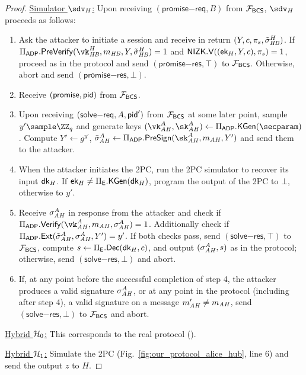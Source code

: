 \begin{proof}
\smallskip
\noindent\underline{Simulator $\Sim_H$:} Upon receiving $(\mathsf{promise}\mathsf{-req}, B)$ from $\mathcal{F}_{\mathsf{BCS}}$, $\Sim_H$ proceeds as follows:
\begin{enumerate}
    \item Ask the attacker to initiate a session and receive in return $(Y, c, \pi_s, \tilde{\sigma}_{\mathit{HB}}^H)$. If $\Pi_\ADP.\prevrfy(\vk_\hb^H, m_\hb, Y, \presig_\hb^H) = 1$ and $\mathsf{NIZK}.\mathsf{V}((\mathsf{ek}_H, Y,c), \pi_s) = 1$, proceed as in the protocol and send $(\mathsf{promise}\mathsf{-res}, \top)$ to $\mathcal{F}_{\mathsf{BCS}}$. Otherwise, abort and send $(\mathsf{promise}\mathsf{-res}, \bot)$.
    \item Receive $(\mathsf{promise}, \mathsf{pid})$ from $\mathcal{F}_{\mathsf{BCS}}$.
    \item Upon receiving $(\mathsf{solve}\mathsf{-req}, A, \mathsf{pid}')$ from $\mathcal{F}_{\mathsf{BCS}}$ at some later point, sample $y' \sample \ZZ_q$ and generate keys $(\vk_\ah^A, \sk_\ah^A) \gets \Pi_\ADP.\kgen(\secparam)$. Compute $Y' \gets g^{y'}$, $\presig_\ah^A \gets \Pi_\ADP.\presign(\sk_\ah^A, m_\ah, Y')$ and send them to the attacker.
    \item When the attacker initiates the 2PC, run the 2PC simulator to recover its input $\mathsf{dk}_H$. If $\mathsf{ek}_H \neq \Pi_{\mathsf{E}}.{\mathsf{KGen}}(\mathsf{dk}_H)$, program the output of the 2PC to $\bot$, otherwise to $y'$.
    \item Receive $\sigma_{\mathit{AH}}^A$ in response from the attacker and check if $\Pi_\ADP.\vrfy(\vk_\ah^A,\allowbreak m_\ah, \sigma_\ah^A) = 1$. Additionally check if $\Pi_{\mathsf{ADP}}.{\mathsf{Ext}}(\tilde{\sigma}_{\mathit{AH}}^A, \sigma_{\mathit{AH}}^A, Y') = y'$. If both checks pass, send $(\mathsf{solve}\mathsf{-res}, \top)$ to $\mathcal{F}_{\mathsf{BCS}}$, compute $s \gets \Pi_{\mathsf{E}}.{\mathsf{Dec}}(\mathsf{dk}_H,\allowbreak c)$, and output $(\sigma_{\mathit{AH}}^A, s)$ as in the protocol; otherwise, send $(\mathsf{solve}\mathsf{-res}, \bot)$ and abort.
    \item If, at any point before the successful completion of step 4, the attacker produces a valid signature $\sigma_{\mathit{AH}}^A$, or at any point in the protocol (including after step 4), a valid signature on a message $m_{\mathit{AH}}' \neq m_{\mathit{AH}}$, send $(\mathsf{solve}\mathsf{-res}, \bot)$ to $\mathcal{F}_{\mathsf{BCS}}$ and abort.
\end{enumerate}

\medskip

\noindent\underline{Hybrid $\mathcal{H}_0$:} This corresponds to the real protocol ().

\smallskip
\noindent\underline{Hybrid $\mathcal{H}_1$:} Simulate the 2PC (Fig.~\ref{fig:our_protocol_alice_hub}, line 6) and send the output $z$ to $H$.


\end{proof}
